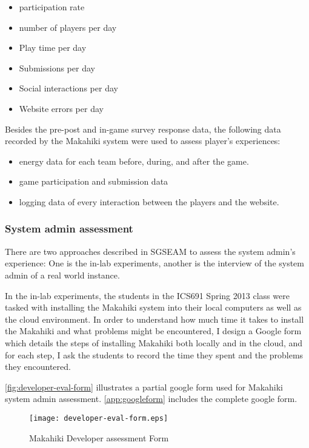 \begin{itemize}
\item participation rate
\item number of players per day
\item Play time per day
\item Submissions per day
\item Social interactions per day
\item Website errors per day
\end{itemize}

Besides the pre-post  and in-game survey response data, the following data recorded by the Makahiki system were used to assess player's experiences:
\begin{itemize}
\item energy data for each team before, during, and after the game.
\item game participation and submission data
\item logging data of every interaction between the players and the website.
\end{itemize}

\subsubsection{System admin assessment}

There are two approaches described in SGSEAM to assess the system admin's experience: One is the in-lab experiments, another is the interview of the system admin of a real world instance.

In the in-lab experiments, the students in the ICS691 Spring 2013 class were tasked with installing the Makahiki system into their local computers as well as the cloud environment. In order to understand how much time it takes to install the Makahiki and what problems might be encountered, I design a Google form which details the steps of installing Makahiki both locally and in the cloud, and for each step, I ask the students to record the time they spent and the problems they encountered.

\autoref{fig:developer-eval-form} illustrates a partial google form used for Makahiki system admin assessment. \autoref{app:googleform} includes the complete google form.
\begin{figure}[ht!]
   \centering
   \texttt{[image: developer-eval-form.eps]}
   \caption{Makahiki Developer assessment Form}
   \label{fig:developer-eval-form}
\end{figure}

